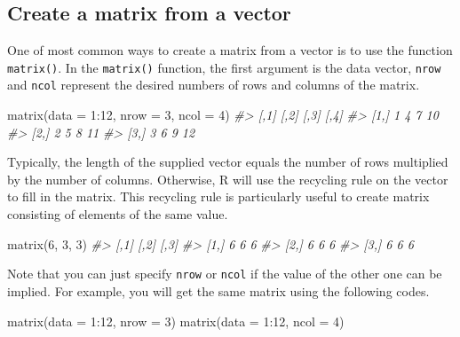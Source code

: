 \documentclass[
]{book}
\newenvironment{Shaded}{\begin{snugshade}}{\end{snugshade}}
\newcommand{\AttributeTok}[1]{\textcolor[rgb]{0.77,0.63,0.00}{#1}}
\newcommand{\CommentTok}[1]{\textcolor[rgb]{0.56,0.35,0.01}{\textit{#1}}}
\newcommand{\DecValTok}[1]{\textcolor[rgb]{0.00,0.00,0.81}{#1}}
\newcommand{\FunctionTok}[1]{\textcolor[rgb]{0.00,0.00,0.00}{#1}}
\newcommand{\NormalTok}[1]{#1}
\newcommand{\SpecialCharTok}[1]{\textcolor[rgb]{0.00,0.00,0.00}{#1}}
\begin{document}
\hypertarget{create-a-matrix-from-a-vector}{%
\subsection{Create a matrix from a vector}\label{create-a-matrix-from-a-vector}}

One of most common ways to create a matrix from a vector is to use the function \texttt{matrix()}. In the \texttt{matrix()} function, the first argument is the data vector, \texttt{nrow} and \texttt{ncol} represent the desired numbers of rows and columns of the matrix.

\begin{Shaded}
\begin{Highlighting}[]
\FunctionTok{matrix}\NormalTok{(}\AttributeTok{data =} \DecValTok{1}\SpecialCharTok{:}\DecValTok{12}\NormalTok{, }\AttributeTok{nrow =} \DecValTok{3}\NormalTok{, }\AttributeTok{ncol =} \DecValTok{4}\NormalTok{)}
\CommentTok{\#\textgreater{}      [,1] [,2] [,3] [,4]}
\CommentTok{\#\textgreater{} [1,]    1    4    7   10}
\CommentTok{\#\textgreater{} [2,]    2    5    8   11}
\CommentTok{\#\textgreater{} [3,]    3    6    9   12}
\end{Highlighting}
\end{Shaded}

Typically, the length of the supplied vector equals the number of rows multiplied by the number of columns. Otherwise, R will use the recycling rule on the vector to fill in the matrix. This recycling rule is particularly useful to create matrix consisting of elements of the same value.

\begin{Shaded}
\begin{Highlighting}[]
\FunctionTok{matrix}\NormalTok{(}\DecValTok{6}\NormalTok{, }\DecValTok{3}\NormalTok{, }\DecValTok{3}\NormalTok{)}
\CommentTok{\#\textgreater{}      [,1] [,2] [,3]}
\CommentTok{\#\textgreater{} [1,]    6    6    6}
\CommentTok{\#\textgreater{} [2,]    6    6    6}
\CommentTok{\#\textgreater{} [3,]    6    6    6}
\end{Highlighting}
\end{Shaded}

Note that you can just specify \texttt{nrow} or \texttt{ncol} if the value of the other one can be implied. For example, you will get the same matrix using the following codes.

\begin{Shaded}
\begin{Highlighting}[]
\FunctionTok{matrix}\NormalTok{(}\AttributeTok{data =} \DecValTok{1}\SpecialCharTok{:}\DecValTok{12}\NormalTok{, }\AttributeTok{nrow =} \DecValTok{3}\NormalTok{)}
\FunctionTok{matrix}\NormalTok{(}\AttributeTok{data =} \DecValTok{1}\SpecialCharTok{:}\DecValTok{12}\NormalTok{, }\AttributeTok{ncol =} \DecValTok{4}\NormalTok{)}
\end{Highlighting}
\end{Shaded}
\end{document}
